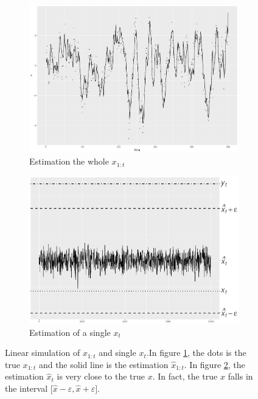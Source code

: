 \begin{figure}[h]
\centering
\begin{subfigure}[b]{0.45\textwidth}
    \includegraphics[width=\textwidth]{Chapters/05MCMCOU/plots/linearsimuXall.pdf}
     \caption{Estimation the whole $x_{1:t}$}\label{MCMClinearsimuXall}
\end{subfigure}
\begin{subfigure}[b]{0.45\textwidth}
	\includegraphics[width=\textwidth]{Chapters/05MCMCOU/plots/gglinearestXt2.pdf}
     \caption{Estimation of a single $x_t$}\label{MCMClinearsimuXt2}
\end{subfigure}
\caption{Linear simulation of $x_{1:t}$ and single $x_t$.In figure \ref{MCMClinearsimuXall}, the dots is the true $x_{1:t}$ and the solid line is the estimation $\hat{x}_{1:t}$. In figure \ref{MCMClinearsimuXt2}, the estimation $\hat{x}_t$ is very close to the true $x$. In fact, the true $x$ falls in the interval $\lbrack \hat{x}-\varepsilon,\hat{x}+\varepsilon\rbrack$.}
\label{linearmarginXt}
\end{figure}



